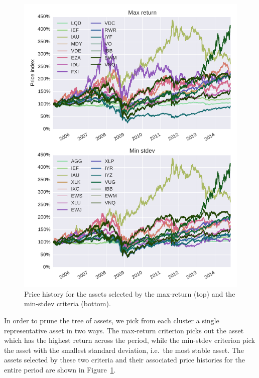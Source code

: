 \begin{figure}[tp]
\centering
\includegraphics{../pic/prices_selected_assets.pdf}
\caption{Price history for the assets selected by the max-return (top) and the min-stdev criteria (bottom).}
\label{fig:prices_selected}
\end{figure}

In order to prune the tree of assets, we pick from each cluster a single representative asset in two ways.
The max-return criterion picks out the asset which has the highest return across the period, while the min-stdev criterion pick the asset with the smallest standard deviation, i.e.\ the most stable asset.
The assets selected by these two criteria and their associated price histories for the entire period are shown in Figure~\ref{fig:prices_selected}.